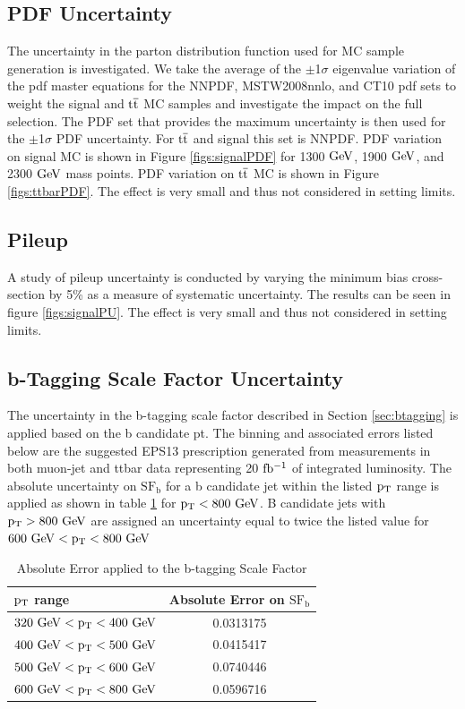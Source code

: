 \subsection{PDF Uncertainty}
The uncertainty in the parton distribution function used for MC sample generation is investigated.  We take the average of the $\pm$1$\sigma$ eigenvalue 
variation of the pdf master equations \cite{Bourilkov:2006cj} 
for the NNPDF, MSTW2008nnlo, and CT10 pdf sets to weight the signal and $\mathrm{t\overline{t}}$ MC samples and investigate the impact on the full selection.  The PDF set 
that provides the maximum uncertainty is then used for the $\pm$1$\sigma$ PDF uncertainty.  For $\mathrm{t\overline{t}}$ and signal this set is NNPDF. PDF 
variation on signal MC is shown in Figure \ref{figs:signalPDF} for 1300$~\mathrm{GeV}$,
 1900$~\mathrm{GeV}$, and 2300$~\mathrm{GeV}$ mass points.  PDF variation on $\mathrm{t\overline{t}}$ MC is shown in Figure \ref{figs:ttbarPDF}.  The effect is very small and thus not considered in setting limits.

\subsection{Pileup}
A study of pileup uncertainty is conducted by varying the minimum bias cross-section by 5\% as a measure of systematic uncertainty.  The results 
can be seen in figure \ref{figs:signalPU}.  The effect is very small and thus not considered in setting limits.

\subsection{b-Tagging Scale Factor Uncertainty}
\label{sec:btagunc}
The uncertainty in the b-tagging scale factor described in Section \ref{sec:btagging} is applied based on the b candidate pt.  The binning and associated errors 
listed below are the suggested EPS13 prescription generated from measurements in both muon-jet and ttbar data representing 20$~\mathrm{fb^{-1}}$ of integrated 
luminosity.  The absolute uncertainty on $\mathrm{SF_b}$ for a b candidate jet within the listed $\mathrm{p_{T}}$ range is applied as shown in table \ref{table:btaggingerrors} 
for $\mathrm{p_{T}} < 800~\mathrm{GeV}$.  B candidate jets with $\mathrm{p_{T}} > 800~\mathrm{GeV}$ are assigned an uncertainty equal to twice the listed value for $600~\mathrm{GeV} < \mathrm{p_{T}} < 800~\mathrm{GeV}$

\begin{table}
\begin{center}
\begin{tabular}{l|c} 
\hline\hline
\bf{$\mathrm{p_{T}}$ range } & \bf{Absolute Error on $\mathrm{SF_b}$} \\
\hline\hline
$320~\mathrm{GeV} < \mathrm{p_{T}} < 400~\mathrm{GeV}$ & 0.0313175 \\
$400~\mathrm{GeV} < \mathrm{p_{T}} < 500~\mathrm{GeV}$ & 0.0415417 \\
$500~\mathrm{GeV} < \mathrm{p_{T}} < 600~\mathrm{GeV}$ & 0.0740446 \\
$600~\mathrm{GeV} < \mathrm{p_{T}} < 800~\mathrm{GeV}$ & 0.0596716 \\
\hline
\end{tabular}
\end{center}
\caption{Absolute Error applied to the b-tagging Scale Factor}
\label{table:btaggingerrors}
\end{table}


